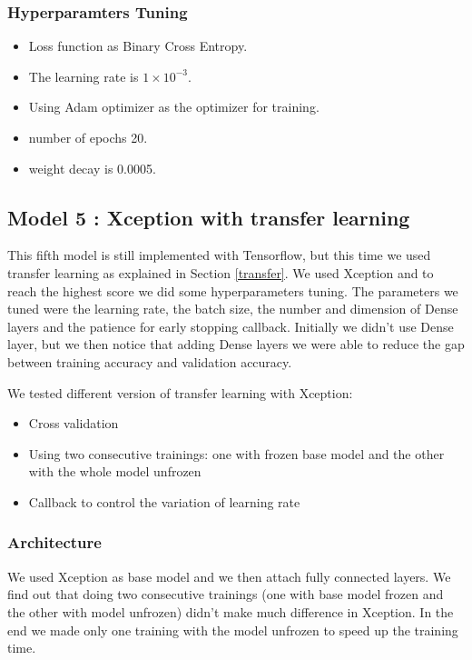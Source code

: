 \documentclass[conference]{IEEEtran}
\begin{document}
\subsubsection{Hyperparamters Tuning}
\begin{itemize}
    \item Loss function as Binary Cross Entropy.
    \item The learning rate is $1\times10^{-3}$.
    \item Using Adam optimizer as the optimizer for training. 
    \item number of epochs 20.
    \item weight decay is 0.0005.
\end{itemize}

\subsection{Model 5 : Xception with transfer learning}
This fifth model is still implemented with Tensorflow, but this time we used transfer learning as explained in Section \ref{transfer}.
We used Xception and to reach the highest score we did some hyperparameters tuning. The parameters we tuned were the learning rate, the batch size, the number and dimension of Dense layers and the patience for early stopping callback.
Initially we didn't use Dense layer, but we then notice that adding Dense layers we were able to reduce the gap between training accuracy and validation accuracy.

We tested different version of transfer learning with Xception:
\begin{itemize}
    \item Cross validation
    \item Using two consecutive trainings: one with frozen base model and the other with the whole model unfrozen
    \item Callback to control the variation of learning rate
\end{itemize}

\subsubsection{Architecture}
We used Xception as base model and we then attach fully connected layers.
We find out that doing two consecutive trainings (one with base model frozen 
and the other with model unfrozen) didn't make much difference in Xception.
In the end we made only one training with the model unfrozen to speed up
the training time.
\end{document}
